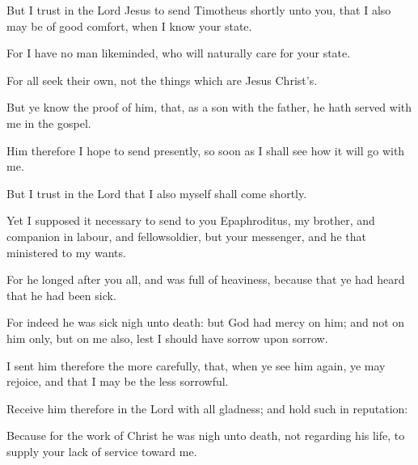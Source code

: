 {\par }{\PP {}But I
trust
in the
Lord
Jesus to
send
Timotheus
shortly unto
you,
that I
also may be of good
comfort, when I
know
your
state.

For I
have no
man
likeminded,
who
will
naturally care
for
your
state.

For
all
seek their
own,
not the things which
are
Jesus
Christ’s.

But ye
know the
proof of
him,
that,
as a
son with the
father, he hath
served
with
me
in the
gospel.

Him
therefore I
hope to
send
presently, so soon
as I shall
see how it will go with me.

But I
trust
in the
Lord
that
I
also
myself shall
come
shortly.

Yet I supposed
it
necessary to
send
to
you
Epaphroditus,
my
brother,
and companion in
labour,
and
fellowsoldier,
but
your
messenger,
and he that
ministered
to
my
wants.

For he longed
after
you
all,
and was full of
heaviness, because
that ye had
heard
that he had been
sick.

For
indeed he was
sick nigh
unto
death:
but
God had mercy
on
him;
and
not on
him
only,
but on
me
also,
lest I should
have
sorrow
upon
sorrow.

I
sent
him
therefore the more
carefully,
that, when ye
see
him
again, ye may
rejoice, and that
I may
be the less
sorrowful.

Receive
him
therefore
in the
Lord
with
all
gladness;
and
hold
such in
reputation:

Because
for the
work of
Christ he was
nigh
unto
death, not
regarding his
life, to
supply
your
lack of
service
toward
me.




\par }
